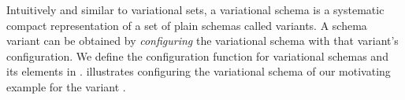 Intuitively and similar to variational sets, a variational schema is a systematic  
compact representation of a set of plain schemas called variants.
A schema variant can be obtained 
by \emph{configuring} the variational schema with that variant's configuration.
We define the configuration function for variational schemas and its elements in .
 illustrates configuring the variational schema of our motivating example
for the variant \setDef {\edu, \vTwo, \tThree}.

